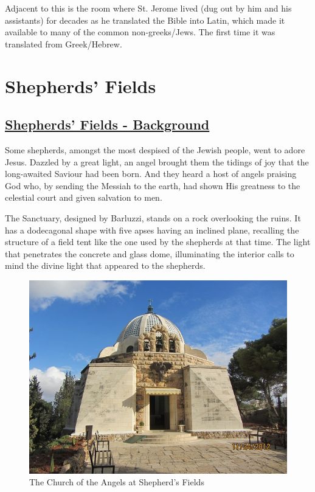 \documentclass[letterpaper]{report}
\begin{document}
Adjacent to this is the room where St. Jerome lived (dug out by him and his assistants) for decades as he translated the Bible into Latin, which made it available to many of the common non-greeks/Jews. The first time it was translated from Greek/Hebrew.

\clearpage
\section{Shepherds' Fields}
\begin{multicols}{2}

\subsection{\href{http://www.custodia.org/default.asp?id=1888}{
Shepherds' Fields - Background}}

Some shepherds, amongst the most despised of the Jewish people,
went to adore Jesus. Dazzled by a great light,
an angel brought them the tidings of joy that the long-awaited Saviour had
been born.
And they heard a host of angels praising God who,
by sending the Messiah to the earth,
had shown His greatness to the celestial court and given salvation to men.

The Sanctuary, designed by Barluzzi, stands on a rock overlooking the ruins.
It has a dodecagonal shape with five apses having an inclined plane,
recalling the structure of a field tent like the one used by the shepherds at 
that time.
The light that penetrates the concrete and glass dome,
illuminating the interior calls to mind the divine light that appeared to the 
shepherds.

\begin{figure}[H]
\centering
\label{fig:ChurchOfTheAngelsAtShepherdsFields}
\caption{The Church of the Angels at Shepherd's Fields}
\includegraphics[width=\columnwidth]{ChurchOfTheAngelsAtShepherdsFields}
\end{figure}

\end{multicols}
\end{document}
